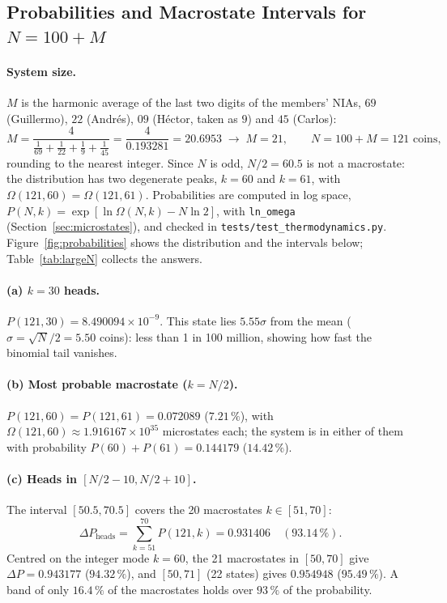 
\subsection{Probabilities and Macrostate Intervals for \texorpdfstring{$N = 100 + M$}{N = 100 + M}}

\paragraph{System size.} $M$ is the harmonic average of the last two digits of the members' NIAs, $69$ (Guillermo), $22$ (Andr\'es), $09$ (H\'ector, taken as $9$) and $45$ (Carlos):
\begin{equation}
    M = \frac{4}{\frac{1}{69} + \frac{1}{22} + \frac{1}{9} + \frac{1}{45}} = \frac{4}{0.193281} = 20.6953 \;\to\; M = 21, \qquad N = 100 + M = 121 \text{ coins},
\end{equation}
rounding to the nearest integer. Since $N$ is odd, $N/2 = 60.5$ is not a macrostate: the distribution has two degenerate peaks, $k = 60$ and $k = 61$, with $\Omega(121, 60) = \Omega(121, 61)$. Probabilities are computed in log space, $P(N,k) = \exp[\ln\Omega(N,k) - N\ln 2]$, with \texttt{ln\_omega} (Section~\ref{sec:microstates}), and checked in \texttt{tests/test\_thermodynamics.py}. Figure~\ref{fig:probabilities} shows the distribution and the intervals below; Table~\ref{tab:largeN} collects the answers.

\paragraph{(a) $k = 30$ heads.} $P(121, 30) = 8.490094 \times 10^{-9}$. This state lies $5.55\sigma$ from the mean ($\sigma = \sqrt{N}/2 = 5.50$ coins): less than 1 in 100 million, showing how fast the binomial tail vanishes.

\paragraph{(b) Most probable macrostate ($k = N/2$).} $P(121, 60) = P(121, 61) = 0.072089$ ($7.21\,\%$), with $\Omega(121, 60) \approx 1.916167 \times 10^{35}$ microstates each; the system is in either of them with probability $P(60) + P(61) = 0.144179$ ($14.42\,\%$).

\paragraph{(c) Heads in $[N/2 - 10, N/2 + 10]$.} The interval $[50.5, 70.5]$ covers the 20 macrostates $k \in [51, 70]$:
\begin{equation}
    \Delta P_{\text{heads}} = \sum_{k=51}^{70} P(121, k) = 0.931406 \quad (93.14\,\%).
\end{equation}
Centred on the integer mode $k = 60$, the 21 macrostates in $[50, 70]$ give $\Delta P = 0.943177$ ($94.32\,\%$), and $[50, 71]$ (22 states) gives $0.954948$ ($95.49\,\%$). A band of only $16.4\,\%$ of the macrostates holds over $93\,\%$ of the probability.

